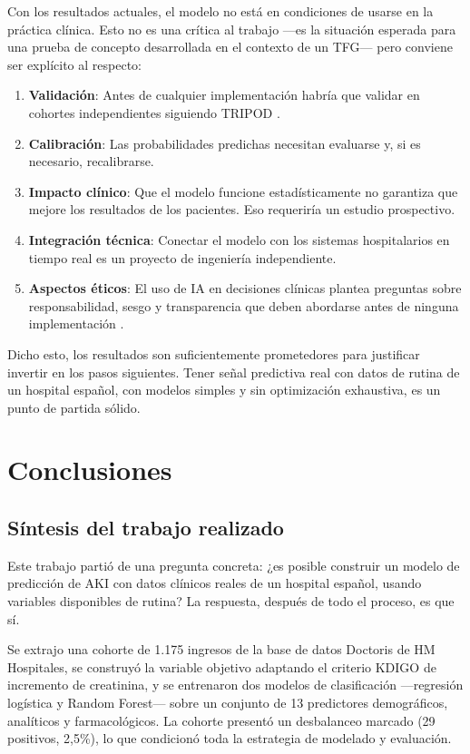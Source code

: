 \documentclass[12pt, a4paper, oneside]{report}
\begin{document}
Con los resultados actuales, el modelo no está en condiciones de usarse en la práctica clínica. Esto no es una crítica al trabajo —es la situación esperada para una prueba de concepto desarrollada en el contexto de un TFG— pero conviene ser explícito al respecto:

\begin{enumerate}
    \item \textbf{Validación}: Antes de cualquier implementación habría que validar en cohortes independientes siguiendo TRIPOD \parencite{collins2015tripod}.
    \item \textbf{Calibración}: Las probabilidades predichas necesitan evaluarse y, si es necesario, recalibrarse.
    \item \textbf{Impacto clínico}: Que el modelo funcione estadísticamente no garantiza que mejore los resultados de los pacientes. Eso requeriría un estudio prospectivo.
    \item \textbf{Integración técnica}: Conectar el modelo con los sistemas hospitalarios en tiempo real es un proyecto de ingeniería independiente.
    \item \textbf{Aspectos éticos}: El uso de IA en decisiones clínicas plantea preguntas sobre responsabilidad, sesgo y transparencia que deben abordarse antes de ninguna implementación \parencite{char2018implementing}.
\end{enumerate}

Dicho esto, los resultados son suficientemente prometedores para justificar invertir en los pasos siguientes. Tener señal predictiva real con datos de rutina de un hospital español, con modelos simples y sin optimización exhaustiva, es un punto de partida sólido.

\chapter{Conclusiones}
\label{chap:conclusiones}

\section{Síntesis del trabajo realizado}

Este trabajo partió de una pregunta concreta: ¿es posible construir un modelo de predicción de AKI con datos clínicos reales de un hospital español, usando variables disponibles de rutina? La respuesta, después de todo el proceso, es que sí.

Se extrajo una cohorte de 1.175 ingresos de la base de datos Doctoris de HM Hospitales, se construyó la variable objetivo adaptando el criterio KDIGO de incremento de creatinina, y se entrenaron dos modelos de clasificación —regresión logística y Random Forest— sobre un conjunto de 13 predictores demográficos, analíticos y farmacológicos. La cohorte presentó un desbalanceo marcado (29 positivos, 2,5\%), lo que condicionó toda la estrategia de modelado y evaluación.
\end{document}
